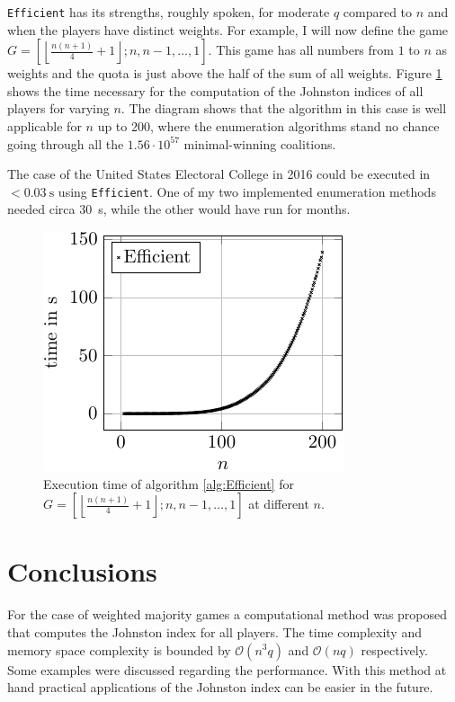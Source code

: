 \documentclass[review]{elsarticle}
\theoremstyle{defn}
\theoremstyle{Pseudo-Code}
\begin{document}
\texttt{Efficient} has its strengths, roughly spoken, for moderate $q$ compared to $n$ and when the players have distinct weights.
For example, I will now define the game $G=[ \left\lfloor \frac{n(n+1)}{4}+1 \right\rfloor ;n,n-1,\dots,1]$. This game has all numbers from $1$ to $n$ as weights and the quota is just above the half of the sum of all weights. Figure \ref{fig:1234Spiel} shows the time necessary for the computation of the Johnston indices of all players for varying $n$. 
The diagram shows that the algorithm in this case is well applicable for $n$ up to 200, where the enumeration algorithms stand no chance going through all the $1.56\cdot 10^{57}$ minimal-winning coalitions.

The case of the United States Electoral College in 2016 could be executed in $<\SI{0.03}{\s}$ using \texttt{Efficient}. One of my two implemented enumeration methods needed circa \SI{30}{\s}, while the other would have run for months.

\noindent
\begin{figure}[!htb]
\centering
\includegraphics[scale=1]{graphic.pdf}
\caption{Execution time of algorithm \ref{alg:Efficient} for $G=[ \left\lfloor \frac{n(n+1)}{4}+1 \right\rfloor ;n,n-1,\dots,1]$ at different $n$.}
\label{fig:1234Spiel}
\end{figure}

\section{Conclusions}
For the case of weighted majority games a computational method was proposed that computes the Johnston index for all players. The time complexity and memory space complexity is bounded by $\mathcal{O}(n^3q)$ and $\mathcal{O}(nq)$ respectively.
Some examples were discussed regarding the performance.
With this method at hand practical applications of the Johnston index can be easier in the future.
\end{document}
